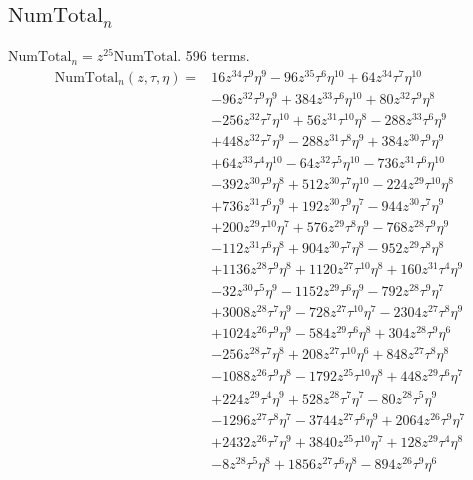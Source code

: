 \subsection*{$\mathrm{NumTotal}_n$}
$\mathrm{NumTotal}_n=z^{25}\mathrm{NumTotal}$. 596 terms.
{\small
\begin{align*}
\mathrm{NumTotal}_n(z,\tau,\eta)={}&16z^{34}\tau^{9}\eta^{9}-96z^{35}\tau^{6}\eta^{10}+64z^{34}\tau^{7}\eta^{10}\\
&-96z^{32}\tau^{9}\eta^{9}+384z^{33}\tau^{6}\eta^{10}+80z^{32}\tau^{9}\eta^{8}\\
&-256z^{32}\tau^{7}\eta^{10}+56z^{31}\tau^{10}\eta^{8}-288z^{33}\tau^{6}\eta^{9}\\
&+448z^{32}\tau^{7}\eta^{9}-288z^{31}\tau^{8}\eta^{9}+384z^{30}\tau^{9}\eta^{9}\\
&+64z^{33}\tau^{4}\eta^{10}-64z^{32}\tau^{5}\eta^{10}-736z^{31}\tau^{6}\eta^{10}\\
&-392z^{30}\tau^{9}\eta^{8}+512z^{30}\tau^{7}\eta^{10}-224z^{29}\tau^{10}\eta^{8}\\
&+736z^{31}\tau^{6}\eta^{9}+192z^{30}\tau^{9}\eta^{7}-944z^{30}\tau^{7}\eta^{9}\\
&+200z^{29}\tau^{10}\eta^{7}+576z^{29}\tau^{8}\eta^{9}-768z^{28}\tau^{9}\eta^{9}\\
&-112z^{31}\tau^{6}\eta^{8}+904z^{30}\tau^{7}\eta^{8}-952z^{29}\tau^{8}\eta^{8}\\
&+1136z^{28}\tau^{9}\eta^{8}+1120z^{27}\tau^{10}\eta^{8}+160z^{31}\tau^{4}\eta^{9}\\
&-32z^{30}\tau^{5}\eta^{9}-1152z^{29}\tau^{6}\eta^{9}-792z^{28}\tau^{9}\eta^{7}\\
&+3008z^{28}\tau^{7}\eta^{9}-728z^{27}\tau^{10}\eta^{7}-2304z^{27}\tau^{8}\eta^{9}\\
&+1024z^{26}\tau^{9}\eta^{9}-584z^{29}\tau^{6}\eta^{8}+304z^{28}\tau^{9}\eta^{6}\\
&-256z^{28}\tau^{7}\eta^{8}+208z^{27}\tau^{10}\eta^{6}+848z^{27}\tau^{8}\eta^{8}\\
&-1088z^{26}\tau^{9}\eta^{8}-1792z^{25}\tau^{10}\eta^{8}+448z^{29}\tau^{6}\eta^{7}\\
&+224z^{29}\tau^{4}\eta^{9}+528z^{28}\tau^{7}\eta^{7}-80z^{28}\tau^{5}\eta^{9}\\
&-1296z^{27}\tau^{8}\eta^{7}-3744z^{27}\tau^{6}\eta^{9}+2064z^{26}\tau^{9}\eta^{7}\\
&+2432z^{26}\tau^{7}\eta^{9}+3840z^{25}\tau^{10}\eta^{7}+128z^{29}\tau^{4}\eta^{8}\\
&-8z^{28}\tau^{5}\eta^{8}+1856z^{27}\tau^{6}\eta^{8}-894z^{26}\tau^{9}\eta^{6}\\

\end{align*}}
